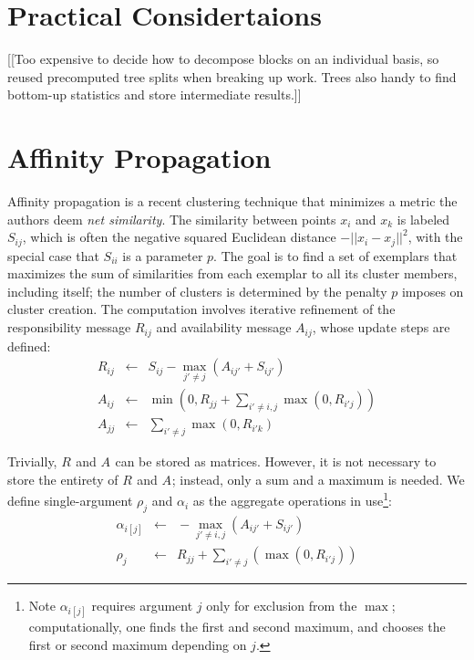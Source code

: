 \documentclass{article}
\newcommand{\eqspace}{\!\!\!\!}
\newcommand{\respo}[2]{R_{#1#2}}
\newcommand{\avail}[2]{A_{#1#2}}
\newcommand{\simil}[2]{S_{#1#2}}
\newcommand{\frho}[1]{\rho_{#1}}
\newcommand{\falpha}[1]{\alpha_{#1}}
\newcommand{\falphaj}[2]{\alpha_{#1[#2]}}
\begin{document}

\section{Practical Considertaions}

[[Too expensive to decide how to decompose blocks on an individual
basis, so reused precomputed tree splits when breaking up work.  Trees
also handy to find bottom-up statistics and store intermediate
results.]]

\section{Affinity Propagation}


Affinity propagation\cite{affinity} is a recent clustering technique that minimizes a metric the authors deem {\it net similarity}.
The similarity between points $x_i$ and $x_k$ is labeled $\simil{i}{j}$, which is often the negative squared Euclidean distance $-||x_i - x_j||^2$, with the special case that $\simil{i}{i}$ is a parameter $p$.
The goal is to find a set of exemplars that maximizes the sum of similarities from each exemplar to all its cluster members, including itself; the number of clusters is determined by the penalty $p$ imposes on cluster creation.
The computation involves iterative refinement of the responsibility message $\respo{i}{j}$ and availability message $\avail{i}{j}$, whose update steps are defined:
\begin{eqnarray*}
  \respo{i}{j} \eqspace&\gets&\eqspace \simil{i}{j} - \max_{j' \neq j} (\avail{i}{j'} + \simil{i}{j'})
  \\
  \avail{i}{j} \eqspace&\gets&\eqspace \min \! \left(\! 0, \respo{j}{j} + \sum_{i' \neq i,j} \max(0, \respo{i'}{j})\!\right)
  \\
  \avail{j}{j} \eqspace&\gets&\eqspace \sum_{i' \neq j} \max(0, \respo{i'}{k})
\end{eqnarray*}


\noindent Trivially, $\respo{}{}$ and $\avail{}{}$ can be stored as matrices.
However, it is not necessary to store the entirety of $\respo{}{}$ and $\avail{}{}$; instead, only a sum and a maximum is needed.
We define single-argument $\frho{j}$ and $\falpha{i}$ as the aggregate operations in use\footnote{
Note $\falphaj{i}{j}$ requires argument $j$ only for exclusion from the $\max$; computationally, one finds the first and second maximum, and chooses the first or second maximum depending on $j$.}:
\begin{eqnarray*}
  \falphaj{i}{j} \eqspace&\gets&\eqspace - \max_{j' \neq i,j} (\avail{i}{j'} + \simil{i}{j'})
  \\
  \frho{j} \eqspace&\gets&\eqspace \respo{j}{j} + \sum_{i' \neq j} \left( \max(0, \respo{i'}{j}) \right)
\end{eqnarray*}
\end{document}
